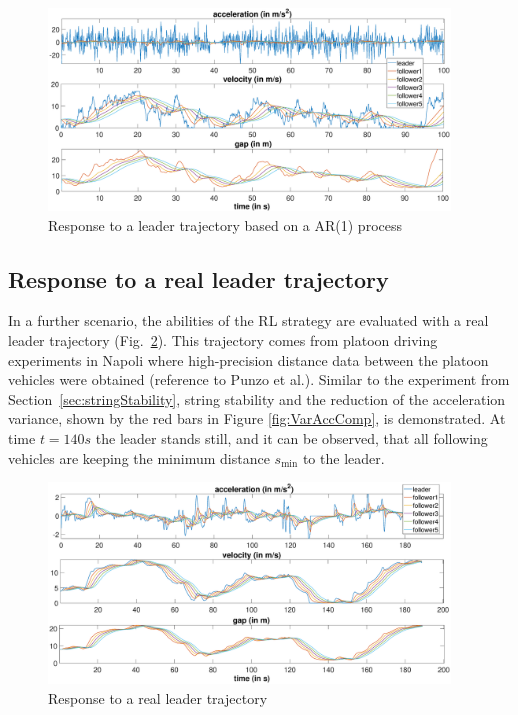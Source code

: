 \documentclass[review]{elsarticle}
\providecommand{\sub}[1]{_{\mathrm{#1}}}  %
\providecommand{\3}{{\ss}}
\begin{document}
\begin{figure}
	\centering
	\includegraphics[width=0.95\textwidth]{images/AR1Kolonne}
	\caption{Response to a leader trajectory based on a AR(1) process}
	\label{fig:AR1Kolonne}
\end{figure}


\subsection{Response to a real leader trajectory}

In a further scenario, the abilities of the RL strategy are evaluated
with a real leader trajectory (Fig.~\ref{fig:PunzoKolonne}). This
trajectory comes from platoon driving experiments in Napoli
where high-precision distance data between the platoon
vehicles were obtained (reference to Punzo et al.). Similar to the experiment from
Section~\ref{sec:stringStability}, string stability and the reduction
of  the acceleration variance, shown by the red bars in Figure
\ref{fig:VarAccComp}, is demonstrated. At time $t = 140s$ the leader
stands still, and it can be observed, that all following vehicles are
keeping the minimum distance $s\sub{min}$ to the leader.  


\begin{figure}
	\centering
	\includegraphics[width=0.95\textwidth]{images/PunzoKolonne}
	\caption{Response to a real leader trajectory}
	\label{fig:PunzoKolonne}
\end{figure}
\end{document}
